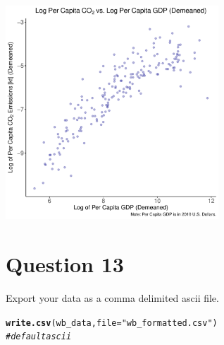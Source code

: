 \documentclass[english, 11pt]{article}\usepackage[]{graphicx}\usepackage[]{color}
\makeatletter
\newcommand{\hlstr}[1]{\textcolor[rgb]{0.192,0.494,0.8}{#1}}%
\newcommand{\hlcom}[1]{\textcolor[rgb]{0.678,0.584,0.686}{\textit{#1}}}%
\newcommand{\hlstd}[1]{\textcolor[rgb]{0.345,0.345,0.345}{#1}}%
\newcommand{\hlkwc}[1]{\textcolor[rgb]{0.333,0.667,0.333}{#1}}%
\newcommand{\hlkwd}[1]{\textcolor[rgb]{0.737,0.353,0.396}{\textbf{#1}}}%
\newenvironment{kframe}{%
 \def\at@end@of@kframe{}%
 \ifinner\ifhmode%
  \def\at@end@of@kframe{\end{minipage}}%
  \begin{minipage}{\columnwidth}%
 \fi\fi%
 \def\FrameCommand##1{\hskip\@totalleftmargin \hskip-\fboxsep
 \colorbox{shadecolor}{##1}\hskip-\fboxsep
     \hskip-\linewidth \hskip-\@totalleftmargin \hskip\columnwidth}%
 \MakeFramed {\advance\hsize-\width
   \@totalleftmargin\z@ \linewidth\hsize
   \@setminipage}}%
 {\par\unskip\endMakeFramed%
 \at@end@of@kframe}
\newenvironment{knitrout}{}{} %
\makeatother
\begin{document}
\begin{knitrout}
\color{fgcolor}

{\centering \includegraphics[width=8cm,height=8cm]{figure/Q_12_output-1} 

}



\end{knitrout}

\noindent \section*{Question 13} Export your data as a comma delimited ascii file.
\begin{knitrout}
\color{fgcolor}\begin{kframe}
\begin{alltt}
\hlkwd{write.csv}\hlstd{(wb_data,} \hlkwc{file} \hlstd{=} \hlstr{"wb_formatted.csv"}\hlstd{)}
\hlcom{#default ascii}
\end{alltt}
\end{kframe}
\end{knitrout}
\end{document}
